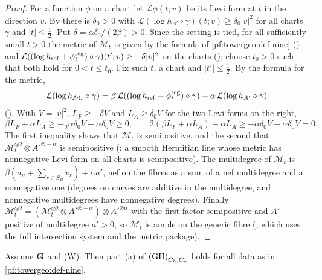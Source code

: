 \begin{proof}
For a function $\phi$ on a chart let $\mathcal L\phi(t;v)$ be its Levi form at $t$ in the direction $v$. By
 there is $\delta_0>0$ with
$\mathcal L(\log h_{A'}\circ\gamma)(t;v)\ge\delta_0|v|^2$ for all charts $\gamma$ and $|t|\le\frac12$. Put
$\delta=\alpha\delta_0/(2\beta)>0$. Since the setting is tied, for all sufficiently small $t>0$ the metric of
$\mathcal M_t$ is given by the formula of \cref{pf:towergeo:def-nine}
() and
$\mathcal L((\log h_{\mathrm{ref}}+\phi^{\mathrm{reg}}_t)\circ\gamma)(t';v)\ge-\delta|v|^2$ on the charts
(); choose $t_0>0$ such that both hold for
$0<t\le t_0$. Fix such $t$, a chart and $|t'|\le\frac12$. By the formula for the metric,
\[
\mathcal L(\log h_{\mathcal M_t}\circ\gamma)=\beta\,\mathcal L((\log h_{\mathrm{ref}}+\phi^{\mathrm{reg}}_t)\circ\gamma)
+\alpha\,\mathcal L(\log h_{A'}\circ\gamma)
\]
(). With $V=|v|^2$, $L_F\ge-\delta V$ and
$L_A\ge\delta_0V$ for the two Levi forms on the right,
\[
\beta L_F+\alpha L_A\ge-\tfrac12\alpha\delta_0V+\alpha\delta_0V\ge0,\qquad
2(\beta L_F+\alpha L_A)-\alpha L_A\ge-\alpha\delta_0V+\alpha\delta_0V=0.
\]
The first inequality shows that $\mathcal M_t$ is semipositive, and the second that $\mathcal M_t^{\otimes2}\otimes
A'^{\otimes-\alpha}$ is semipositive (: a smooth Hermitian
line whose metric has nonnegative Levi form on all charts is semipositive). The multidegree of $\mathcal M_t$ is
$\beta(a_\mu+\sum_{r\in S_B}v_r)+\alpha a'$, nef on the fibres as a sum of a nef multidegree and a nonnegative one
(degrees on curves are additive in the multidegree, and nonnegative multidegrees have nonnegative degrees). Finally $\mathcal M_t^{\otimes2}=(\mathcal M_t^{\otimes2}\otimes
A'^{\otimes-\alpha})\otimes A'^{\otimes\alpha}$ with the first factor semipositive and $A'$ positive of multidegree
$a'>0$, so $\mathcal M_t$ is ample on the generic fibre
(, which uses the full intersection system and the
metric package).
\end{proof}

\begin{proposition}[Positivity]\label{pf:towergeo:posU}
Assume $\mathbf G$ and \textup{(W)}. Then part (a) of $\textup{(GH)}_{C_h,C_u}$ holds for all data as in
\cref{pf:towergeo:def-nine}.
\end{proposition}

